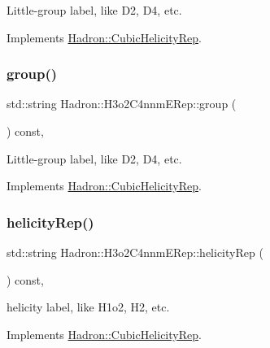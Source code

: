 Little-\/group label, like D2, D4, etc. 

Implements \mbox{\hyperlink{structHadron_1_1CubicHelicityRep_a101a7d76cd8ccdad0f272db44b766113}{Hadron\+::\+Cubic\+Helicity\+Rep}}.

\mbox{\label{structHadron_1_1H3o2C4nnmERep_a94fc651e597e1a65fb7be16b3b6e8ef9}} 
\subsubsection{\texorpdfstring{group()}{group()}\hspace{0.1cm}{\footnotesize\ttfamily [2/2]}}
{\footnotesize\ttfamily std\+::string Hadron\+::\+H3o2\+C4nnm\+E\+Rep\+::group (\begin{DoxyParamCaption}{ }\end{DoxyParamCaption}) const\hspace{0.3cm}{\ttfamily [inline]}, {\ttfamily [virtual]}}

Little-\/group label, like D2, D4, etc. 

Implements \mbox{\hyperlink{structHadron_1_1CubicHelicityRep_a101a7d76cd8ccdad0f272db44b766113}{Hadron\+::\+Cubic\+Helicity\+Rep}}.

\mbox{\label{structHadron_1_1H3o2C4nnmERep_a4ca04daa91fc608d0c528d0e0eb6a24e}} 
\subsubsection{\texorpdfstring{helicityRep()}{helicityRep()}\hspace{0.1cm}{\footnotesize\ttfamily [1/2]}}
{\footnotesize\ttfamily std\+::string Hadron\+::\+H3o2\+C4nnm\+E\+Rep\+::helicity\+Rep (\begin{DoxyParamCaption}{ }\end{DoxyParamCaption}) const\hspace{0.3cm}{\ttfamily [inline]}, {\ttfamily [virtual]}}

helicity label, like H1o2, H2, etc. 

Implements \mbox{\hyperlink{structHadron_1_1CubicHelicityRep_af1096946b7470edf0a55451cc662f231}{Hadron\+::\+Cubic\+Helicity\+Rep}}.


